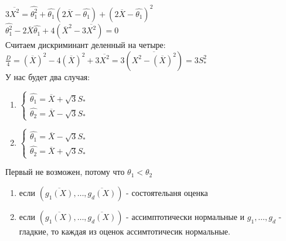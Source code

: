 \documentclass{article}
\newcommand\0{\mathbb{0}}
\newcommand\1{\mathbb{1}}
\begin{document}
$3\overline{X^2} = \widehat{\theta_1^2} + \widehat{\theta_1}(2\overline{X} - \widehat{\theta_1}) + (2\overline{X} - \widehat{\theta_1})^2$\\
$\widehat{\theta_1^2} - 2\overline{X}\widehat{\theta_1} + 4(\overline{X}^2 - 3\overline{X^2}) = 0$\\
Считаем дискриминант деленный на четыре:\\
$\frac{D}{4} = (\overline{X})^2 - 4(\overline{X})^2 + 3\overline{X^2} = 3(\overline{X^2 - (\overline{X})^2}) = 3S_*^2$\\
У нас будет два случая:\\
\begin{enumerate}
    \item $\begin{cases}
        \widehat{\theta_1} = \overline{X} + \sqrt{3}S_*\\
        \widehat{\theta_2} = \overline{X} - \sqrt{3}S_*
    \end{cases}$
    \item $\begin{cases}
        \widehat{\theta_1} = \overline{X} - \sqrt{3}S_*\\
        \widehat{\theta_2} = \overline{X} + \sqrt{3}S_*
    \end{cases}$
\end{enumerate}
Первый не возможен, потому что $\theta_1 < \theta_2$\\
\begin{enumerate}
    \item если $(\overline{g_1(X)}, \dots, \overline{g_d(X)})$ - состоятельаня оценка
    \item если $(\overline{g_1(X)}, \dots, \overline{g_d(X)})$ - ассимптотически нормальные и $g_1, \dots, g_d$ - гладкие, то каждая из оценок ассимтотичесик нормальные.
\end{enumerate}
\end{document}
